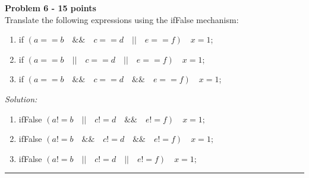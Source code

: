 \documentclass[a4paper, 11pt]{article}
\newenvironment{problem}[2][Problem]
    { \begin{mdframed}[backgroundcolor=gray!20] \textbf{#1 #2} \\}
    {  \end{mdframed}}
\newenvironment{solution}
    {\textit{Solution:}}
    {}
\begin{document}

\begin{problem}{6 - 15 points}
Translate the following expressions using the ifFalse mechanism: 

\begin{enumerate}[a]
    \item if $(a==b \quad \&\& \quad c==d \quad || \quad e==f) \quad x = 1$;  
    \item if $(a==b \quad || \quad c==d \quad || \quad e==f) \quad x = 1$;  
    \item if $(a==b \quad \&\& \quad c==d \quad \&\& \quad e==f) \quad x = 1$; 
\end{enumerate}

\end{problem}

\begin{solution}
\begin{enumerate}[a]
    \item ifFalse $(a  != b \quad || \quad c != d \quad \&\& \quad e != f) \quad x = 1;$
    \item ifFalse $(a  != b \quad \&\& \quad c != d \quad \&\& \quad e != f) \quad x = 1;$
    \item ifFalse $(a  != b \quad || \quad c != d \quad || \quad e != f) \quad x = 1;$
\end{enumerate}
\end{solution} 



\noindent\rule{7in}{2.8pt}
\end{document}
